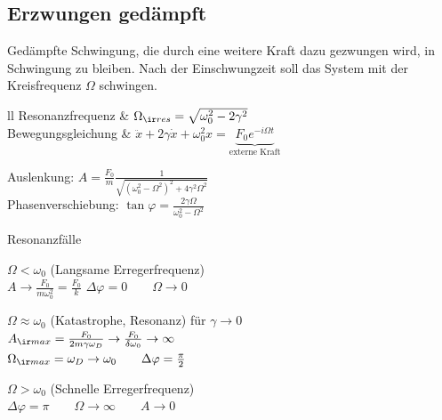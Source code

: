 \begin{sectionbox}
	\subsection{Erzwungen gedämpft}
    Gedämpfte Schwingung, die durch eine weitere Kraft dazu gezwungen wird, in Schwingung zu bleiben.
	Nach der Einschwungzeit soll das System mit der Kreisfrequenz $\Omega$ schwingen. \\

    \begin{tablebox}{ll}
        Resonanzfrequenz & $\Omega_{\ir res}=\sqrt{\omega_0^2-2\gamma^2}$ \\
        Bewegungsgleichung & $\ddot{x}+2\gamma \dot{x}+\omega_0^2x=\underbrace{F_0e^{-i\Omega t}}_{\text{externe Kraft}}$
    \end{tablebox}

    Auslenkung: $A = \frac{F_0}{m}\frac{1}{\sqrt{(\omega_0^2-\Omega^2)^2+4\gamma^2\Omega^2}}$ \\
    Phasenverschiebung: $\tan\varphi = \frac{2\gamma\Omega}{\omega_0^2-\Omega^2}$

    \begin{cookbox}{Resonanzfälle}
		\item $\Omega < \omega_0$ (Langsame Erregerfrequenz) \\
		$A\rightarrow \frac{F_0}{m\omega_0^2}=\frac{F_0}{k}$\qquad
		$\Delta \varphi = 0 \qquad \Omega \rightarrow 0$
		
        \item $\Omega \approx \omega_0$ (Katastrophe, Resonanz) für $\gamma \rightarrow 0$ \\
		$A_{\ir max}=\frac{F_0}{2m\gamma \omega_D} \rightarrow \frac{F_0}{\delta\omega_0} \rightarrow \infty$\\
		$\Omega_{\ir max}=\omega_D \rightarrow \omega_0 \qquad \Delta \varphi = \frac{\pi}{2}$
		
        \item $\Omega > \omega_0$ (Schnelle Erregerfrequenz) \\
		$\Delta \varphi = \pi \qquad \Omega \rightarrow \infty \qquad A\rightarrow 0$
	\end{cookbox}
    
\end{sectionbox}